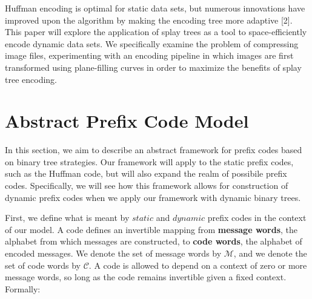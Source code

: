 \documentclass[twoside]{article}
\begin{document}
\begin{multicols}{2}
Huffman encoding is optimal for static data sets, but numerous innovations have improved upon the algorithm by making the encoding tree more adaptive [2]. This paper will explore the application of splay trees as a tool to space-efficiently encode dynamic data sets. We specifically examine the problem of compressing image files, experimenting with an encoding pipeline in which images are first transformed using plane-filling curves in order to maximize the benefits of splay tree encoding.


\vspace{-0.5em}
\section{Abstract Prefix Code Model}


In this section, we aim to describe an abstract framework for prefix codes based on binary tree strategies. Our framework will apply to the static prefix codes, such as the Huffman code, but will also expand the realm of possibile prefix codes. Specifically, we will see how this framework allows for construction of dynamic prefix codes when we apply our framework with dynamic binary trees.

First, we define what is meant by $static$ and $dynamic$ prefix codes in the context of our model. A code defines an invertible mapping from \textbf{message words}, the alphabet from which messages are constructed, to \textbf{code words}, the alphabet of encoded messages. We denote the set of message words by $\mathcal{M}$, and we denote the set of code words by $\mathcal{C}$. A code is allowed to depend on a context of zero or more message words, so long as the code remains invertible given a fixed context. Formally:


\end{multicols}
\end{document}
